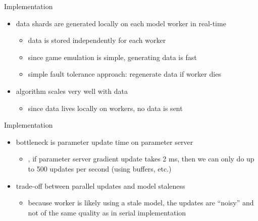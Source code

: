 \begin{frame}{Implementation}
    \begin{itemize}\itemsep=12pt

        \item data shards are generated locally on each model worker in real-time
        \vspace*{0.5em}
        \begin{itemize}
            \item data is stored independently for each worker
            \item since game emulation is simple, generating data is fast
            \item simple fault tolerance approach: regenerate data if worker dies
        \end{itemize}

        \item algorithm scales very well with data
        \vspace*{0.5em}
        \begin{itemize}
            \item since data lives locally on workers, no data is sent
        \end{itemize}

    \end{itemize}
\end{frame}

\begin{frame}{Implementation}
    \begin{itemize}\itemsep=12pt

        \item bottleneck is parameter update time on parameter server
        \vspace*{0.5em}
        \begin{itemize}
            \item \eg, if parameter server gradient update takes 2 ms, then we can only do up to 500 updates per second (using buffers, etc.)
        \end{itemize}

        \item trade-off between parallel updates and model staleness
        \vspace*{0.5em}
        \begin{itemize}
            \item because worker is likely using a stale model, the updates are ``noisy'' and not of the same quality as in serial implementation
        \end{itemize}

    \end{itemize}
\end{frame}

